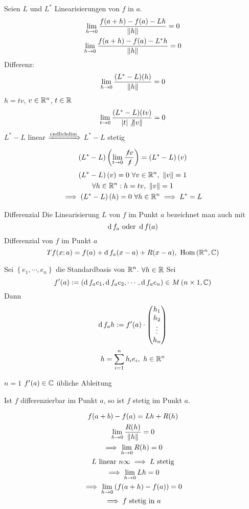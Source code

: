 \begin{Bew}
  Seien $L$ und $L^*$ Linearisierungen von $f$ in $a$.
  \begin{gather*}
    \displaystyle\lim_{h\rightarrow0} \frac{f(a+h)-f(a)-Lh}{\left\| h \right\|}=0\\
    \displaystyle\lim_{h\rightarrow0} \frac{f(a+h)-f(a)-L^*h}{\left\| h \right\|}=0
  \end{gather*}
  Differenz:
  \[\displaystyle\lim_{h\rightarrow0}\frac{(L^*-L)(h)}{\left\| h \right\|}=0\]
  $h=tv$, $v\in\mathbb{R}^n$, $t\in\mathbb{R}$
  \[\displaystyle\lim_{t\rightarrow0}\frac{(L^*-L)(tv)}{\left| t \right|\not\left\| v \right\|}=0\]
  $L^*-L$ linear $\xRightarrow{\text{endlichdim}}$ $L^*-L$ stetig
  \[(L^*-L)\left( \displaystyle\lim_{t\rightarrow0}\frac{\not t v}{\not t} \right)=\left( L^*-L \right)(v)\]
  \begin{gather*}
    \left( L^*-L \right)(v)=0\ \forall v\in\mathbb{R}^n,\ \left\| v \right\|=1\\
    \forall h\in\mathbb{R}^n:h=tv,\ \left\| v \right\|=1\\
    \implies \left( L^*-L \right)(h)=0\ \forall h\in\mathbb{R}^n\implies L^*=L
  \end{gather*}
\end{Bew}
\begin{Def}{Differenzial}
  Die Linearisierung $L$ von $f$ im Punkt $a$ bezeichnet man auch mit 
  \[\md f_a\ \text{oder}\ \md f(a)\]
  Differenzial von $f$ im Punkt $a$
  \[Tf(x;a)=f(a)+\md f_a(x-a)+R(x-a),\ \Hom\left( \mb{R}^n,\mb{C} \right)\]
\end{Def}
\begin{Bem}
  Sei $\left\{ e_1,\cdots,e_n \right\}$ die Standardbasis von $\mathbb{R}^n$. $\forall h\in \mathbb{R}$
  Sei
  \[f'(a):=\left( \operatorname{d} f_ae_1,\operatorname{d} f_ae_2,\cdots,\operatorname{d} f_ae_n \right)\in M\left( n\times 1,\mathbb{C} \right)\]
  Dann
  \[\operatorname{d} f_ah:=f'(a)\cdot \begin{pmatrix}h_1\\h_2\\\vdots\\h_n\end{pmatrix}\]
  \[h=\sum^n_{i=1}h_ie_i,\ h\in\mathbb{R}^n\]
\end{Bem}
\begin{Bem}
  $n=1$ $f'(a)\in\mathbb{C}$ übliche Ableitung
\end{Bem}
\begin{Sat}
  Ist $f$ differenzierbar im Punkt $a$, so ist $f$ stetig im Punkt $a$.
\end{Sat}
\begin{Bew}
  \begin{gather*}
    f(a+b)-f(a)=Lh+R(h)\\
    \displaystyle\lim_{h\rightarrow0}\frac{R(h)}{\left\| h \right\|}=0\\
    \implies\displaystyle\lim_{h\rightarrow0}R(h)=0\\
    L\ \text{linear $n\infty$} \implies L\ \text{stetig}\\
    \implies \displaystyle\lim_{h\rightarrow0}Lh=0\\
    \implies\displaystyle\lim_{h\rightarrow0}\left( f(a+h)-f(a) \right)=0\\
    \implies f\ \text{stetig in}\ a
  \end{gather*}
\end{Bew}
